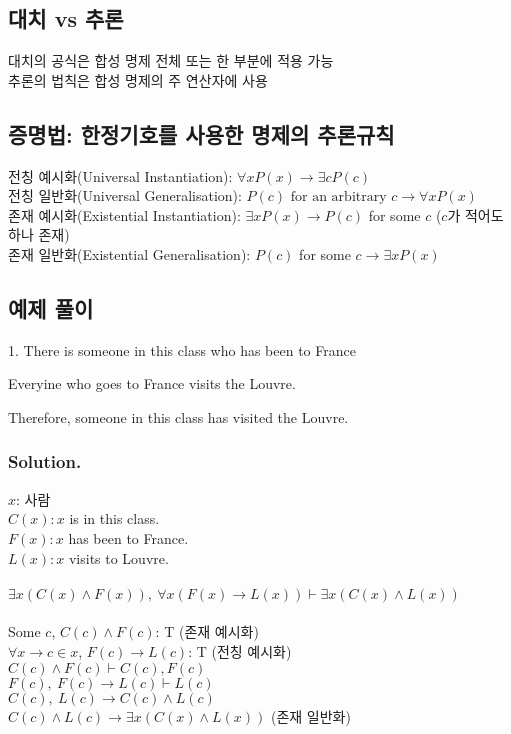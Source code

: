 \subsection{대치 vs 추론}
대치의 공식은 합성 명제 전체 또는 한 부분에 적용 가능\\
추론의 법칙은 합성 명제의 주 연산자에 사용

\subsection{증명법: 한정기호를 사용한 명제의 추론규칙}
전칭 예시화(Universal Instantiation): $\forall x P(x) \to \exists c P(c)$\\
전칭 일반화(Universal Generalisation): $P(c)\text{ for an arbitrary }c \to \forall x P(x)$\\
존재 예시화(Existential Instantiation): $\exists x P(x) \to P(c)$ for some $c$ ($c$가 적어도 하나 존재)\\
존재 일반화(Existential Generalisation): $P(c)$ for some $c \to \exists x P(x)$

\subsection{예제 풀이}
1. There is someone in this class who has been to France

Everyine who goes to France visits the Louvre.

Therefore, someone in this class has visited the Louvre.
\subsubsection{Solution.}$$$$
$x$: 사람\\
$C(x): x$ is in this class.\\
$F(x): x$ has been to France.\\
$L(x): x$ visits to Louvre.\\\\
$\exists x(C(x) \land F(x)),\ \forall x(F(x) \to L(x))\vdash\exists x(C(x)\land L(x))$\\\\
Some $c$, $C(c)\land F(c)$: T (존재 예시화)\\
$\forall x \to c \in x$, $F(c) \to L(c)$: T (전칭 예시화)\\
$C(c) \land F(c) \vdash C(c), F(c)$\\
$F(c),\ F(c)\to L(c) \vdash L(c)$\\
$C(c),\ L(c)\to C(c) \land L(c)$\\
$C(c)\land L(c) \to \exists x (C(x) \land L(x))$ (존재 일반화)

